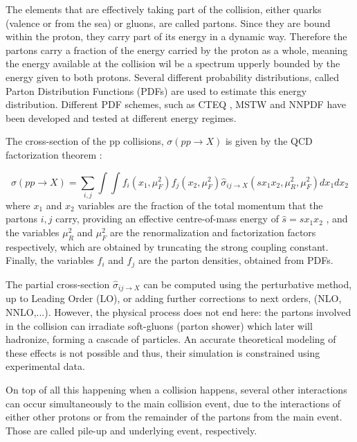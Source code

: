 The elements that are effectively taking part of the collision, either quarks (valence or from the sea) or gluons,  are called partons. Since they are bound within the proton, they carry part of its energy in a dynamic way. Therefore the partons carry a fraction of the energy carried by the proton as a whole, meaning the energy available at the collision wil be a spectrum upperly bounded by the energy given to both protons. Several different probability distributions, called Parton Distribution Functions (PDFs) are used to estimate this energy distribution. Different PDF schemes, such as CTEQ \cite{Pumplin:2002vw}, MSTW \cite{Martin:2009iq} and NNPDF \cite{Ball:2008by} have been developed and tested at different energy regimes.

The cross-section of the pp collisions, $\sigma(pp\rightarrow X)$ is given by the QCD factorization theorem \cite{Butterworth:2012fj}:

\begin{equation}
    \sigma(pp\rightarrow X) = \sum_{i,j} \int \int f_i (x_1 , \mu_F^2 )f_j (x_2 , \mu_F^2 ) \hat{\sigma}_{ij \rightarrow X} (s x_1 x_2 , \mu_R^2 , \mu_F^2 ) dx_1 dx_2 
\end{equation}
where $x_1$ and $x_2$ variables are the fraction of the total momentum that the partons $i,j$ carry, providing an effective centre-of-mass energy of $\hat{s} = sx_1 x_2$ , and the variables $\mu_R^2$ and $\mu_F^2$ are the renormalization and factorization factors respectively, which are obtained by truncating the strong coupling constant. Finally, the variables $f_i$ and $f_j$ are the parton densities, obtained from PDFs.

The partial cross-section $\hat{\sigma}_{ij \rightarrow X}$ can be computed using the perturbative method, up to Leading Order (LO), or adding further corrections to next orders, (NLO, NNLO,...). However, the physical process does not end here: the partons involved in the collision can irradiate soft-gluons (parton shower) which later will hadronize, forming a cascade of particles. An accurate theoretical modeling of these effects is not possible and thus, their simulation is constrained using experimental data.

On top of all this happening when a collision happens, several other interactions can occur simultaneously to the main collision event, due to the interactions of either other protons or from the remainder of the partons from the main event. Those are called pile-up and underlying event, respectively.


